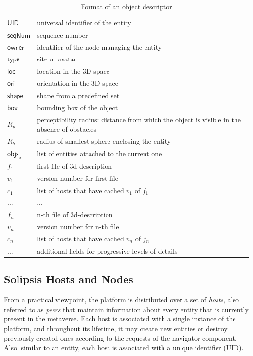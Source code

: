 \begin{table}
\centering
\begin{tabular}{|l|p{8cm}|}
\hline
  $\mathsf{UID}$ & universal identifier of the entity\\
  $\mathsf{seqNum}$ & sequence number\\
\hline
  $\mathsf{owner}$ & identifier of the node managing the entity\\
  $\mathsf{type}$ & site or avatar\\
  $\mathsf{loc}$ & location in the 3D space\\
  $\mathsf{ori}$ & orientation in the 3D space\\
  $\mathsf{shape}$& shape from a predefined set\\
  $\mathsf{box}$ & bounding box of the object\\
  $R_p$ & perceptibility radius: distance from which the object is
  visible in the absence of obstacles\\
  $R_b$ & radius of  smallest sphere enclosing the entity\\
  $\mathsf{objs}_a$ & list of entities attached to the current one\\
  \hline
  $f_1$ & first file of 3d-description \\
  $v_1$ & version number for first file\\
  $c_1$ & list of hosts that have cached $v_1$ of $f_1$\\
  ...& ...\\
  $f_n$& n-th file of 3d-description\\
  $v_n$& version number for n-th file\\
  $c_n$& list of hosts that have cached $v_n$ of $f_n$\\
  \hline
  ... & additional fields for progressive levels of details\\
  \hline
\end{tabular}

\caption{Format of an object descriptor}
\label{tab:desc}
\end{table}


\subsection{Solipsis Hosts and Nodes}
From a practical viewpoint, the \sol platform is distributed over a
set of \emph{hosts}, also referred to as \emph{peers} that maintain
information about every entity that is currently present in the
metaverse.  Each host is associated with a single instance of the \sol
platform, and throughout its lifetime, it may create new entities or
destroy previously created ones according to the requests of the
navigator component. Also, similar to an entity, each host is
associated with a unique identifier (UID).

